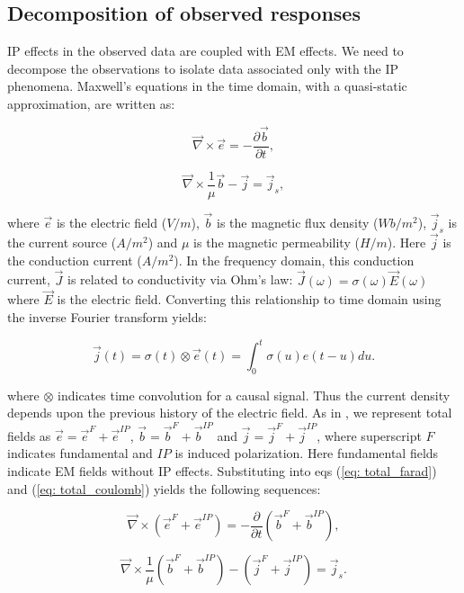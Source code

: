 \documentclass[letterpaper,11pt]{article}
\newcommand{\curl}{{\vec \nabla}\times}
\newcommand {\J}{{\vec J}}
\newcommand {\E}{{\vec E}}
\renewcommand {\j}  { {\vec j} }
\renewcommand {\b}  { {\vec b} }
\newcommand {\e}  { {\vec e} }
\begin{document}
\subsection{Decomposition of observed responses}
\label{sec:Decomposition}
IP effects in the observed data are coupled with EM effects. We need to decompose the observations to isolate data associated only with the IP phenomena.  
Maxwell's equations in the time domain, with a quasi-static approximation, are written as:
\begin{linenomath*}
\begin{equation}
  \curl{\e} = -\frac{\partial \b}{\partial t},
  \label{eq: total_farad}
\end{equation}
\end{linenomath*}
\begin{linenomath*}
\begin{equation}
  \curl{\frac{1}{\mu}\b} - \j= \j_{s},
  \label{eq: total_coulomb}
\end{equation}
\end{linenomath*}
where $\e$ is the electric field ($V/m$), $\b$ is the magnetic flux density ($Wb/m^2$), $\j_{s}$ is the current source ($A/m^2$) and $\mu$ is the magnetic permeability ($H/m$). Here $\j$ is the conduction current ($A/m^2$). In the frequency domain, this conduction current, $\J$ is related to conductivity via Ohm’s law: $\J(\omega) = \sigma(\omega)\E(\omega)$ where $\E$ is the electric field. 
Converting this relationship to time domain using the inverse Fourier transform yields:
\begin{linenomath*}
\begin{equation}
  \j(t) = \sigma(t)\otimes \e(t) = \int_0^t \sigma(u) e(t-u) du.
  \label{eq: ohms_law_convolution}
\end{equation}
\end{linenomath*}
where $\otimes$ indicates time convolution for a causal signal.  
Thus the current density depends upon the previous history of the electric field.
As in \cite{Smith1988a}, we represent total fields as $\e = \e^{F} + \e^{IP}$, $\b = \b^{F} + \b^{IP}$ and $\j = \j^{F} + \j^{IP}$, where superscript $F$ indicates fundamental and $IP$ is induced polarization. 
Here fundamental fields indicate EM fields without IP effects. 
Substituting into eqs (\ref{eq: total_farad}) and (\ref{eq: total_coulomb}) yields the following sequences:
\begin{linenomath*}
\begin{equation}
  \curl({\e^{F}+\e^{IP}}) = -\frac{\partial}{\partial t} (\b^{F}+\b^{IP}),
\end{equation}
\end{linenomath*}
\begin{linenomath*}
\begin{equation}
  \curl\frac{1}{\mu}(\b^{F}+\b^{IP}) - (\j^{F}+\j^{IP})= \j_{s}.
\end{equation}
\end{linenomath*}
\end{document}
